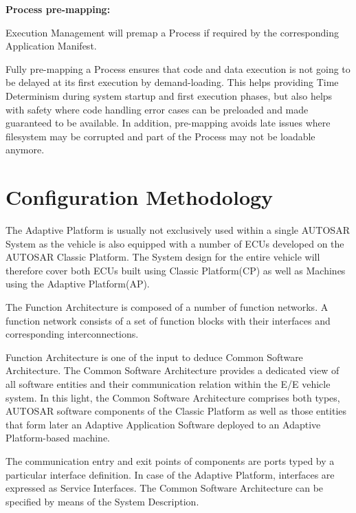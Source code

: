 \begin{DoxyItemize}
\begin{DoxyItemize}
\end{DoxyItemize}
\item {\bfseries Process pre-\/mapping\+:}
\begin{DoxyItemize}
\item Execution Management will premap a Process if required by the corresponding Application Manifest.
\item Fully pre-\/mapping a Process ensures that code and data execution is not going to be delayed at its first execution by demand-\/loading. This helps providing Time Determinism during system startup and first execution phases, but also helps with safety where code handling error cases can be preloaded and made guaranteed to be available. In addition, pre-\/mapping avoids late issues where filesystem may be corrupted and part of the Process may not be loadable anymore. 
\end{DoxyItemize}
\end{DoxyItemize}\hypertarget{adaptive_configurationmethodology}{}\section{Configuration Methodology}\label{adaptive_configurationmethodology}
The Adaptive Platform is usually not exclusively used within a single A\+U\+T\+O\+S\+AR System as the vehicle is also equipped with a number of E\+C\+Us developed on the A\+U\+T\+O\+S\+AR Classic Platform. The System design for the entire vehicle will therefore cover both E\+C\+Us built using Classic Platform(\+C\+P) as well as Machines using the Adaptive Platform(\+A\+P).


\begin{DoxyItemize}
\item The Function Architecture is composed of a number of function networks. A function network consists of a set of function blocks with their interfaces and corresponding interconnections.
\item Function Architecture is one of the input to deduce Common Software Architecture. The Common Software Architecture provides a dedicated view of all software entities and their communication relation within the E/E vehicle system. In this light, the Common Software Architecture comprises both types, A\+U\+T\+O\+S\+AR software components of the Classic Platform as well as those entities that form later an Adaptive Application Software deployed to an Adaptive Platform-\/based machine.
\item The communication entry and exit points of components are ports typed by a particular interface definition. In case of the Adaptive Platform, interfaces are expressed as Service Interfaces. The Common Software Architecture can be specified by means of the System Description.
\end{DoxyItemize}

